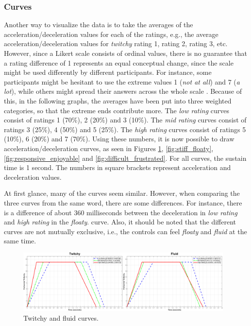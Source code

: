 \subsubsection{Curves}
Another way to visualize the data is to take the averages of the acceleration/deceleration values for each of the ratings, e.g., the average acceleration/deceleration values for \textit{twitchy} rating 1, rating 2, rating 3, etc. However, since a Likert scale consists of ordinal values, there is no guarantee that a rating difference of 1 represents an equal conceptual change, since the scale might be used differently by different participants. For instance, some participants might be hesitant to use the extreme values 1 (\textit{not at all}) and 7 (\textit{a lot}), while others might spread their answers across the whole scale \cite{cunningham}. Because of this, in the following graphs, the averages have been put into three weighted categories, so that the extreme ends contribute more. The \textit{low rating} curves consist of ratings 1 (70\%), 2 (20\%) and 3 (10\%). The \textit{mid rating} curves consist of ratings 3 (25\%), 4 (50\%) and 5 (25\%). The \textit{high rating} curves consist of ratings 5 (10\%), 6 (20\%) and 7 (70\%). Using these numbers, it is now possible to draw acceleration/deceleration curves, as seen in Figures \ref{fig:twitchy_fluid}, \ref{fig:stiff_floaty}, \ref{fig:responsive_enjoyable} and \ref{fig:difficult_frustrated}. For all curves, the sustain time is 1 second. The numbers in square brackets represent acceleration and deceleration values.

At first glance, many of the curves seem similar. However, when comparing the three curves from the same word, there are some differences. For instance, there is a difference of about 360 milliseconds between the deceleration in \textit{low rating} and \textit{high rating} in the \textit{floaty}. curve. Also, it should be noted that the different curves are not mutually exclusive, i.e., the controls can feel \textit{floaty} and \textit{fluid} at the same time.
\begin{figure}[!htb]
\centering
\includegraphics[width=0.97\textwidth]{Pics/Curves/twitchy_fluid}
\caption{Twitchy and fluid curves.}
\label{fig:twitchy_fluid}
\end{figure}

